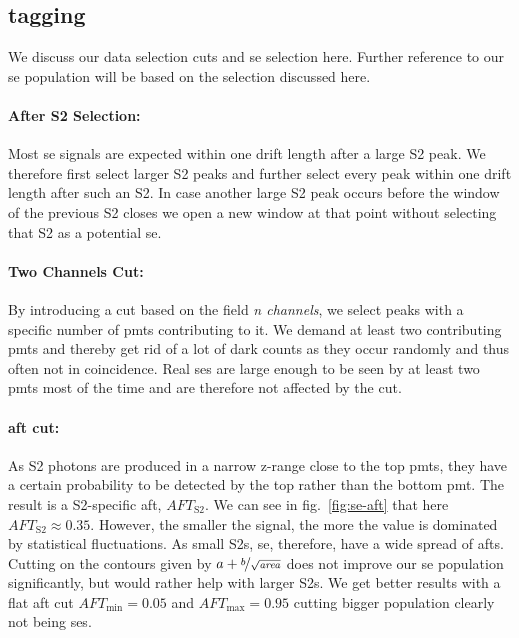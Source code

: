 
\FloatBarrier
\subsection{tagging}
\label{ssec:tagging}
\FloatBarrier


We discuss our data selection cuts and \gls{se} selection here.
Further reference to our \gls{se} population will be based on the selection discussed here.

\paragraph{After S2 Selection:} Most \gls{se} signals are expected within one drift length after a large S2 peak.
We therefore first select larger S2 peaks and further select every peak within one drift length after such an S2.
In case another large S2 peak occurs before the window of the previous S2 closes we open a new window at that point without selecting that S2 as a potential \gls{se}.


\paragraph{Two Channels Cut:} By introducing a cut based on the field \emph{n channels}, we select peaks with a specific number of \glspl{pmt} contributing to it.
We demand at least two contributing \glspl{pmt} and thereby get rid of a lot of dark counts as they occur randomly and thus often not in coincidence.
Real \glspl{se} are large enough to be seen by at least two \glspl{pmt} most of the time and are therefore not affected by the cut.

\paragraph{\gls{aft} cut:} As S2 photons are produced in a narrow z-range close to the top \glspl{pmt}, they have a certain probability to be detected by the top rather than the bottom \gls{pmt}.
The result is a S2-specific \gls{aft}, $ \mathit{AFT}_\mathrm{S2} $.
We can see in fig.~\ref{fig:se-aft} that here $ \mathit{AFT}_\mathrm{S2} \approx 0.35 $.  %
However, the smaller the signal, the more the value is dominated by statistical fluctuations.
As small S2s, \gls{se}, therefore, have a wide spread of \glspl{aft}.
Cutting on the contours given by $ a + \nicefrac{b}{\sqrt{\mathit{area}}} $ does not improve our \gls{se} population significantly, but would rather help with larger S2s.
We get better results with a flat \gls{aft} cut $ \mathit{AFT}_\mathrm{min} = 0.05 $ and $ \mathit{AFT}_\mathrm{max} = 0.95 $ cutting bigger population clearly not being \glspl{se}.


